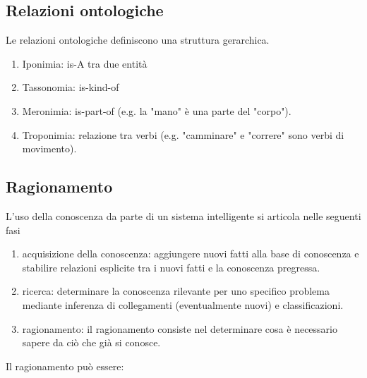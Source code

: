\subsection{Relazioni ontologiche}
Le relazioni ontologiche definiscono una struttura gerarchica. 

\begin{enumerate}
	
	\item Iponimia: is-A tra due entità
	
	\item Tassonomia: is-kind-of 
	
	\item Meronimia: is-part-of (e.g. la "mano" è una parte del "corpo").
	
	\item Troponimia: relazione tra verbi (e.g. "camminare" e "correre" sono verbi di movimento).
	
\end{enumerate}

\subsection{Ragionamento}
L'uso della conoscenza da parte di un sistema intelligente si articola nelle seguenti fasi

\begin{enumerate}
	
	\item acquisizione della conoscenza: aggiungere nuovi fatti alla base di conoscenza e stabilire relazioni esplicite tra i nuovi fatti e la conoscenza pregressa.
	
	\item ricerca: determinare la conoscenza rilevante per uno specifico problema mediante inferenza di collegamenti (eventualmente nuovi) e classificazioni.
	
	\item ragionamento: il ragionamento consiste nel determinare cosa è necessario sapere da ciò che già si conosce.
	
\end{enumerate}

Il ragionamento può essere:

